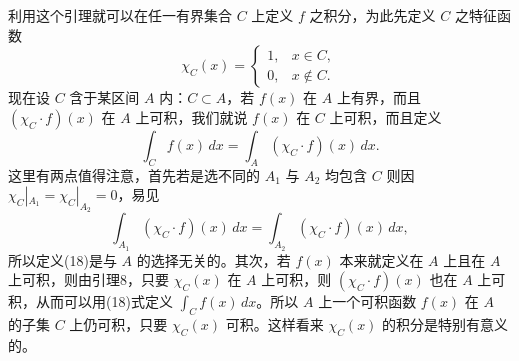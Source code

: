 利用这个引理就可以在任一有界集合 $C$ 上定义 $f$ 之积分，为此先定义 $C$ 之特征函数
\begin{equation}
 \chi_C(x)=\begin{cases}
 1,&x\in C,\\
 0,&x\notin C.
 \end{cases}
 \tag{17}
\end{equation}
现在设 $C$ 含于某区间 $A$ 内：$C\subset A$，若 $f(x)$ 在 $A$ 上有界，而且 $(\chi_C\cdot f)(x)$ 在 $A$ 上可积，我们就说 $f(x)$ 在 $C$ 上可积，而且定义
\begin{equation}
 \int_C f(x)\,dx=\int_A(\chi_C\cdot f)(x)\,dx.
 \tag{18}
\end{equation}
这里有两点值得注意，首先若是选不同的 $A_1$ 与 $A_2$ 均包含 $C$ 则因 $\chi_C|_{A_1}=\chi_C|_{A_2}=0$，易见
\[
 \int_{A_1}(\chi_C\cdot f)(x)\,dx=\int_{A_2}(\chi_C\cdot f)(x)\,dx,
\]
所以定义(18)是与 $A$ 的选择无关的。其次，若 $f(x)$ 本来就定义在 $A$ 上且在 $A$ 上可积，则由引理8，只要 $\chi_C(x)$ 在 $A$ 上可积，则 $(\chi_C\cdot f)(x)$ 也在 $A$ 上可积，从而可以用(18)式定义 $\int_C f(x)\,dx$。所以 $A$ 上一个可积函数 $f(x)$ 在 $A$ 的子集 $C$ 上仍可积，只要 $\chi_C(x)$ 可积。这样看来 $\chi_C(x)$ 的积分是特别有意义的。

